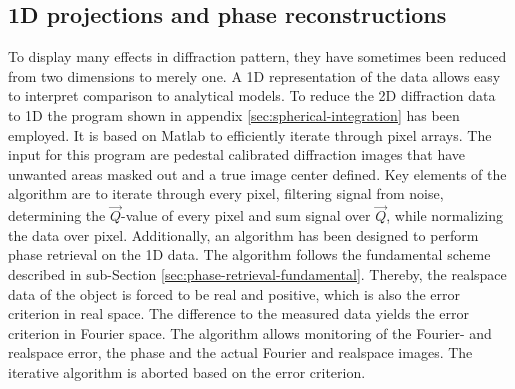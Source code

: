 \subsection{1D projections and phase reconstructions}\label{sec:1d-proj-and-phase-reconstruction}
To display many effects in diffraction pattern, they have sometimes been reduced from two dimensions to merely one. A 1D representation of the data allows easy to interpret comparison to analytical models. To reduce the 2D diffraction data to 1D the program shown in appendix \ref{sec:spherical-integration} has been employed. It is based on Matlab to efficiently iterate through pixel arrays. The input for this program are pedestal calibrated diffraction images that have unwanted areas masked out and a true image center defined. Key elements of the algorithm are to iterate through every pixel, filtering signal from noise, determining the $\vec{Q}$-value of every pixel and sum signal over $\vec{Q}$, while normalizing the data over pixel. Additionally, an algorithm has been designed to perform phase retrieval on the 1D data.
The algorithm follows the fundamental scheme described in sub-Section \ref{sec:phase-retrieval-fundamental}. Thereby, the realspace data of the object is forced to be real and positive, which is also the error criterion in real space. The difference to the measured data yields the error criterion in Fourier space. The algorithm allows monitoring of the Fourier- and realspace error, the phase and the actual Fourier and realspace images. The iterative algorithm is aborted based on the error criterion.
%
%
%

